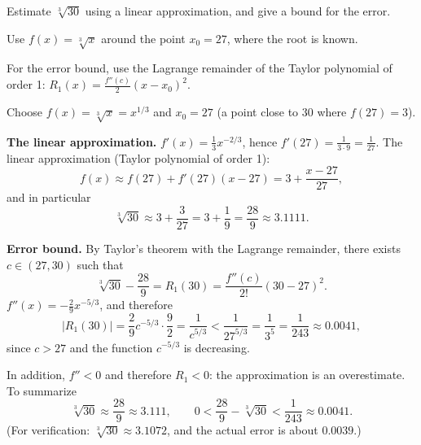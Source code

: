 
\begin{question}
Estimate $\sqrt[3]{30}$ using a linear approximation, and give a bound for the error.
\end{question}

\begin{hint}
Use $f(x)=\sqrt[3]{x}$ around the point $x_0=27$, where the root is known.
\end{hint}

\begin{hint}
For the error bound, use the Lagrange remainder of the Taylor polynomial of order 1: $R_1(x)=\frac{f''(c)}{2}(x-x_0)^2$.
\end{hint}

\begin{solution}
Choose $f(x)=\sqrt[3]{x}=x^{1/3}$ and $x_0=27$ (a point close to $30$ where $f(27)=3$).

\textbf{The linear approximation.} $f'(x)=\frac13x^{-2/3}$, hence $f'(27)=\frac{1}{3\cdot 9}=\frac1{27}$. The linear approximation (Taylor polynomial of order 1):
\[ f(x)\approx f(27)+f'(27)(x-27)=3+\frac{x-27}{27}, \]
and in particular
\[ \sqrt[3]{30}\approx 3+\frac{3}{27}=3+\frac19=\frac{28}{9}\approx 3.1111. \]

\textbf{Error bound.} By Taylor's theorem with the Lagrange remainder, there exists $c\in(27,30)$ such that
\[ \sqrt[3]{30}-\frac{28}{9} = R_1(30) = \frac{f''(c)}{2!}(30-27)^2. \]
$f''(x)=-\frac29x^{-5/3}$, and therefore
\[ |R_1(30)| = \frac{2}{9}c^{-5/3}\cdot\frac{9}{2} = \frac{1}{c^{5/3}} < \frac{1}{27^{5/3}}=\frac{1}{3^5}=\frac1{243}\approx 0.0041, \]
since $c>27$ and the function $c^{-5/3}$ is decreasing.

In addition, $f''<0$ and therefore $R_1<0$: the approximation is an overestimate. To summarize
\[ \boxed{\sqrt[3]{30}\approx\frac{28}{9}\approx3.111,\qquad 0<\frac{28}{9}-\sqrt[3]{30}<\frac{1}{243}\approx0.0041.} \]
(For verification: $\sqrt[3]{30}\approx3.1072$, and the actual error is about $0.0039$.)
\end{solution}

